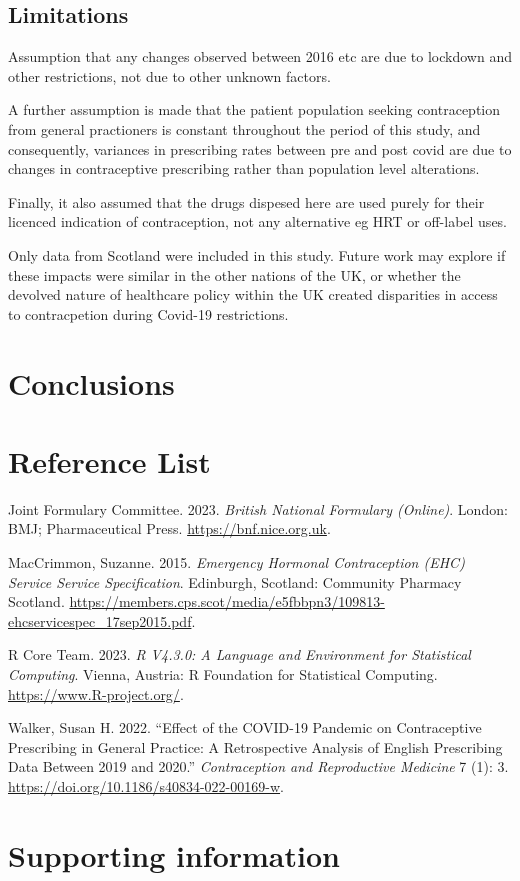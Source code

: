 \documentclass[
]{article}
\newlength{\cslhangindent}
\newlength{\cslentryspacingunit} %
\newenvironment{CSLReferences}[2] %
 {%
  \setlength{\parindent}{0pt}
  \ifodd #1
  \let\oldpar\par
  \def\par{\hangindent=\cslhangindent\oldpar}
  \fi
  \setlength{\parskip}{#2\cslentryspacingunit}
 }%
 {}
\begin{document}
\hypertarget{limitations}{%
\subsection{Limitations}\label{limitations}}

Assumption that any changes observed between 2016 etc are due to
lockdown and other restrictions, not due to other unknown factors.

A further assumption is made that the patient population seeking
contraception from general practioners is constant throughout the period
of this study, and consequently, variances in prescribing rates between
pre and post covid are due to changes in contraceptive prescribing
rather than population level alterations.

Finally, it also assumed that the drugs dispesed here are used purely
for their licenced indication of contraception, not any alternative eg
HRT or off-label uses.

Only data from Scotland were included in this study. Future work may
explore if these impacts were similar in the other nations of the UK, or
whether the devolved nature of healthcare policy within the UK created
disparities in access to contracpetion during Covid-19 restrictions.

\hypertarget{conclusions}{%
\section{Conclusions}\label{conclusions}}

\hypertarget{reference-list}{%
\section{Reference List}\label{reference-list}}

\hypertarget{refs}{}
\begin{CSLReferences}{1}{0}
\leavevmode{}%
Joint Formulary Committee. 2023. \emph{British National Formulary
(Online)}. London: BMJ; Pharmaceutical Press.
\url{https://bnf.nice.org.uk}.

\leavevmode{}%
MacCrimmon, Suzanne. 2015. \emph{Emergency Hormonal Contraception (EHC)
Service Service Specification}. Edinburgh, Scotland: Community Pharmacy
Scotland.
\url{https://members.cps.scot/media/e5fbbpn3/109813-ehcservicespec_17sep2015.pdf}.

\leavevmode{}%
R Core Team. 2023. \emph{R V4.3.0: A Language and Environment for
Statistical Computing}. Vienna, Austria: R Foundation for Statistical
Computing. \url{https://www.R-project.org/}.

\leavevmode{}%
Walker, Susan H. 2022. {``Effect of the COVID-19 Pandemic on
Contraceptive Prescribing in General Practice: A Retrospective Analysis
of English Prescribing Data Between 2019 and 2020.''}
\emph{Contraception and Reproductive Medicine} 7 (1): 3.
\url{https://doi.org/10.1186/s40834-022-00169-w}.

\end{CSLReferences}

\hypertarget{supporting-information}{%
\section{Supporting information}\label{supporting-information}}
\end{document}
